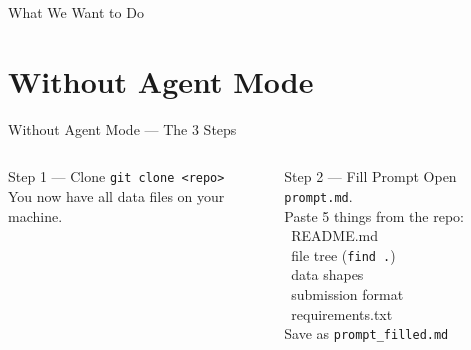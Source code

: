 \documentclass[aspectratio=169,t,10pt]{beamer}
\begin{document}
\begin{frame}{What We Want to Do}
\end{frame}

\section{Without Agent Mode}

\begin{frame}{Without Agent Mode --- The 3 Steps}

\begin{center}
\end{center}

\vspace{4pt}

\begin{columns}[T]
\begin{block}{\small Step 1 --- Clone}
\vspace{2pt}
{\scriptsize
\texttt{git clone <repo>}\\[2pt]
You now have all data files on your machine.
}
\end{block}

\begin{alertblock}{\small Step 2 --- Fill Prompt}
\vspace{2pt}
{\scriptsize
Open \texttt{prompt.md}.\\
Paste 5 things from the repo:\\[2pt]
\textbullet\ README.md\\
\textbullet\ file tree (\texttt{find .})\\
\textbullet\ data shapes\\
\textbullet\ submission format\\
\textbullet\ requirements.txt\\[2pt]
Save as \texttt{prompt\_filled.md}
}
\end{alertblock}


\end{columns}
\end{frame}
\end{document}

